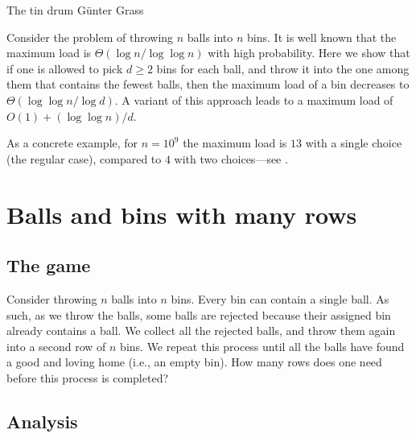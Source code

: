 %

\ChapterPrefix{}%
\ChapterGen{}


%
{The tin drum}%
{G{\"u}nter Grass}%

\bigskip%
\noindent%
Consider the problem of throwing $n$ balls into $n$ bins. It is well
known that the maximum load is $\Theta( \log n / \log \log n)$ with high
probability. Here we show that if one is allowed to pick {$d \geq 2$ bins
   for each ball, and throw it into the one among them that contains the
   fewest balls,} then the maximum load of a bin decreases to
$\Theta( \log \log n/ \log d)$. A variant of this approach leads to a maximum
load of {$O(1) + (\log \log n)/ d$.}

As a concrete example, for $n=10^9$ the maximum load is $13$ with a
single choice (the regular case), compared to $4$ with two choices---see
.




\section{Balls and bins with many rows}
%

\subsection{The game}

Consider throwing $n$ balls into $n$ bins. Every bin can contain a
single ball. As such, as we throw the balls, some balls are
rejected because their assigned bin already contains a ball. We
collect all the rejected balls, and throw them again into a second row
of $n$ bins. We repeat this process until all the balls have found a
good and loving home (i.e., an empty bin). How many rows does one need
before this process is completed?

\subsection{Analysis}

